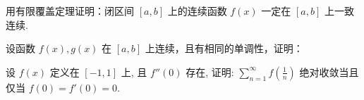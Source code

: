用有限覆盖定理证明：闭区间 $[a, b]$ 上的连续函数 $f(x)$ 一定在 $[a, b]$ 上一致连续.\par
\par{}
设函数 $f(x), g(x)$ 在 $[a, b]$ 上连续，且有相同的单调性，证明：\par
\nopagebreak[4]
设 $f(x)$ 定义在 $[-1, 1]$ 上, 且 $f''(0)$ 存在, 证明: $\sum_{n=1}^{\infty} f\left(\frac{1}{n}\right)$ 绝对收敛当且仅当 $f(0) = f'(0) = 0$.\par
